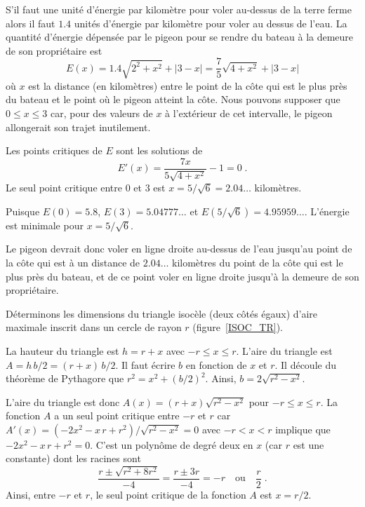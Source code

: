 {\begin{egg}[\life]
S'il faut une unité d'énergie par kilomètre pour voler au-dessus de la
terre ferme alors il faut $1.4$ unités d'énergie par kilomètre pour
voler au dessus de l'eau.  La quantité d'énergie dépensée par le
pigeon pour se rendre du bateau à la demeure de son propriétaire
est
\[
E(x) = 1.4 \sqrt{2^2 + x^2} + |3-x| = \frac{7}{5} \sqrt{4+x^2} + |3-x|
\]
où $x$ est la distance (en kilomètres) entre le point de la côte qui
est le plus près du bateau et le point où le pigeon atteint la
côte. Nous pouvons supposer que $0\leq x \leq 3$ car, pour des valeurs de
$x$ à l'extérieur de cet intervalle, le pigeon allongerait son trajet
inutilement.

Les points critiques de $E$ sont les solutions de
\[
E'(x) = \frac{7x}{5\sqrt{4+x^2}} - 1 = 0 \; .
\]
Le seul point critique entre $0$ et $3$ est $x = 5/\sqrt{6} = 2.04\ldots$
kilomètres.

Puisque $E(0) = 5.8$, $E(3) = 5.04777\ldots$ et
$E(5/\sqrt{6}) = 4.95959\ldots$.  L'énergie est minimale pour
$x=5/\sqrt{6}$.

Le pigeon devrait donc voler en ligne droite au-dessus de l'eau
jusqu'au point de la côte qui est à un distance de $2.04\ldots$
kilomètres du point de la côte qui est le plus près du bateau, et de
ce point voler en ligne droite jusqu'à la demeure de son
propriétaire.
\end{egg}


\begin{egg}[\eng]
Déterminons les dimensions du triangle isocèle (deux côtés égaux)
d'aire maximale inscrit dans un cercle de rayon $r$
(figure~\ref{ISOC_TR}).

La hauteur du triangle est $h=r+x$ avec $-r \leq x \leq r$.  L'aire du
triangle est $A = h\,b/2 = (r+x)\,b/2$.  Il faut écrire $b$ en
fonction de $x$ et $r$.  Il découle du théorème de Pythagore que
$r^2 = x^2 + (b/2)^2$.  Ainsi, $b = 2 \sqrt{r^2-x^2}$.

L'aire du triangle est donc $A(x) = (r+x)\sqrt{r^2-x^2}$ pour
$-r \leq x \leq r$.  La fonction $A$ a un seul point critique entre
$-r$ et $r$ car $A'(x) = (-2x^2-x\,r +r^2)/\sqrt{r^2-x^2} = 0$ avec
$-r<x<r$ implique que $-2x^2-x\,r +r^2 = 0$.  C'est un polynôme de
degré deux en $x$ (car $r$ est une constante) dont les racines sont
\[
\frac{r \pm \sqrt{r^2+8r^2}}{-4} = \frac{r \pm 3 r}{-4} = -r \quad
\text{ou} \quad \frac{r}{2}\; .
\]
Ainsi, entre $-r$ et $r$, le seul point critique de la fonction $A$
est $x = r/2$.


\end{egg}}
